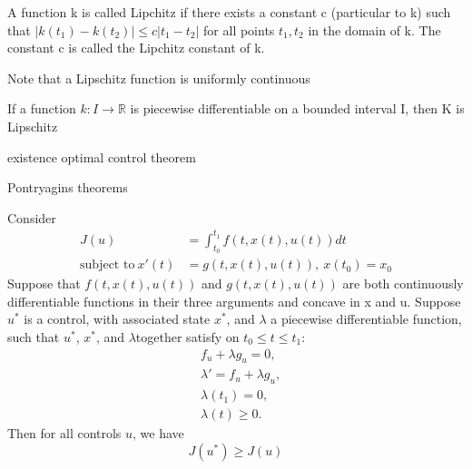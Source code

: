 
\begin{definition}
	A function k is called Lipchitz if there exists a constant c (particular
    to k) such that $|k(t_1) - k(t_2)| \leq c|t_1 - t_2|$ for all points $t_1,
    t_2$ in the domain of k. The constant c is called the Lipchitz constant of 
    k.
\end{definition}

Note that a Lipschitz function is uniformly continuous
\begin{theorem}
	If a function $k : I \rightarrow \mathbb{R}$ is piecewise differentiable on
    a bounded interval I, then K is Lipschitz
\end{theorem}

existence optimal control theorem

Pontryagins theorems


\begin{theorem}
	Consider
    \begin{align*}
    	J(u) &= \int_{t_0}^{t_1} f(t,x(t),u(t))dt \\
        \text{subject to} \ x'(t) &= g(t,x(t),u(t)), \ x(t_0) = x_0 
    \end{align*}
    Suppose that $f(t,x(t),u(t))$ and $g(t,x(t),u(t))$ are both continuously 
    differentiable functions in their three arguments and concave in x and u. 
    Suppose $u^{*}$ is a control, with associated state $x^{*}$, and $\lambda$
    a piecewise differentiable function, such that $u^{*}$, $x^{*}$, and 
    $\lambda$together satisfy on $t_0 \leq t \leq t_1$:
    \begin{align*}
    	& f_{u} + \lambda g_{u} = 0, \\
        & \lambda ' = f_{u} + \lambda g_{u}, \\
        & \lambda (t_1) = 0, \\
        & \lambda (t) \geq 0.
    \end{align*}
    Then for all controls $u$, we have
    $$
    	J(u^{*}) \geq J(u)
    $$
\end{theorem}

